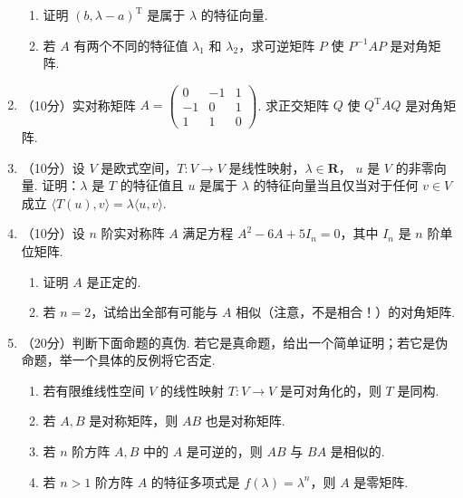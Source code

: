 \begin{enumerate}
\begin{enumerate}
    \item 证明 $(b,\lambda-a)^\mathrm{T}$ 是属于 $\lambda$ 的特征向量.

    \item 若 $A$ 有两个不同的特征值 $\lambda_1$ 和 $\lambda_2$，求可逆矩阵 $P$ 使 $P^{-1}AP$ 是对角矩阵.
\end{enumerate}

\item （10分）实对称矩阵 $A=\begin{pmatrix}0 & -1 & 1 \\ -1 & 0 & 1 \\ 1 & 1 & 0\end{pmatrix}$.  求正交矩阵 $Q$ 使 $Q^\mathrm{T}AQ$ 是对角矩阵.

    \item （10分）设 $V$ 是欧式空间，$T\colon V\to V$ 是线性映射，$\lambda \in \mathbf{R}$， $u$ 是 $V$ 的非零向量. 证明：$\lambda$ 是 $T$ 的特征值且 $u$ 是属于 $\lambda$ 的特征向量当且仅当对于任何 $v\in V$ 成立 $\langle T(u),v\rangle = \lambda\langle u,v\rangle$.

    \item （10分）设 $n$ 阶实对称阵 $A$ 满足方程 $A^2-6A+5I_n=0$，其中 $I_n$ 是 $n$ 阶单位矩阵.
    \begin{enumerate}
        \item 证明 $A$ 是正定的.

        \item 若 $n=2$，试给出全部有可能与 $A$ 相似（注意，不是相合！）的对角矩阵.
    \end{enumerate}

\item （20分）判断下面命题的真伪. 若它是真命题，给出一个简单证明；若它是伪命题，举一个具体的反例将它否定.
    \begin{enumerate}
        \item 若有限维线性空间 $V$ 的线性映射 $T\colon V \to V$ 是可对角化的，则 $T$ 是同构.

        \item 若 $A,B$ 是对称矩阵，则 $AB$ 也是对称矩阵.

        \item 若 $n$ 阶方阵 $A,B$ 中的 $A$ 是可逆的，则 $AB$ 与 $BA$ 是相似的.

        \item 若 $n>1$ 阶方阵 $A$ 的特征多项式是 $f(\lambda)=\lambda^n$，则 $A$ 是零矩阵.
    \end{enumerate}
\end{enumerate}

\clearpage
